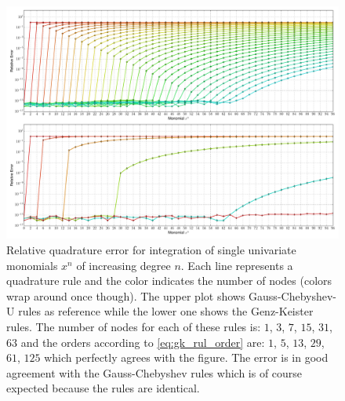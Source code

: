 \documentclass[a4paper,10pt]{article}
\begin{document}
\clearpage

\begin{figure}
  \centering
  \includegraphics[width=\linewidth]{./img/monomial_errors_chebyshevu.pdf}
  \caption{Relative quadrature error for integration of single univariate monomials $x^n$ of increasing degree $n$.
  Each line represents a quadrature rule and the color indicates the number of nodes (colors wrap around once though).
  The upper plot shows Gauss-Chebyshev-U rules as reference while the lower one shows the Genz-Keister rules.
  The number of nodes for each of these rules is:
  $1$, $3$,  $7$, $15$, $31$,  $63$ and the orders according to \eqref{eq:gk_rul_order} are:
  $1$, $5$, $13$, $29$, $61$, $125$ which perfectly agrees with the figure.
  The error is in good agreement with the Gauss-Chebyshev rules which is of course
  expected because the rules are identical.}
  \label{fig:monomial_errors_chebyshevu}
\end{figure}
\end{document}
